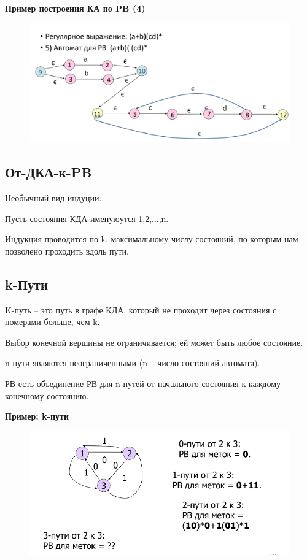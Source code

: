 \documentclass{article}
\begin{document}
\textbf{Пример построения КА по PB (4)}

\begin{figure}[H]
    \centering
    \includegraphics[width=1\linewidth]{Снимок экрана 2025-03-20 090047.png}
\end{figure}


\subsection{От-ДКА-к-PB}

Необычный вид индуции.

Пусть состояния КДА именуюутся 1,2,...,n.

Индукция проводится по k, максимальному числу
состояний, по которым нам позволено проходить вдоль
пути.


\subsection{k-Пути}

K-путь – это путь в графе КДА, который не проходит
через состояния с номерами больше, чем k.

Выбор конечной вершины не ограничивается; ей может
быть любое состояние.

n-пути являются неограниченными (n – число состояний
автомата).

РВ есть объединение РВ для n-путей от начального
состояния к каждому конечному состоянию.

\textbf{Пример: k-пути}

\begin{figure}[H]
    \centering
    \includegraphics[width=1\linewidth]{Снимок экрана 2025-03-20 091100.png}
\end{figure}
\end{document}
